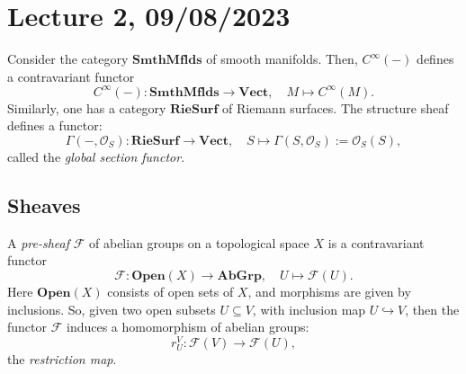 \documentclass[a4paper]{report}
\theoremstyle{definition}
\theoremstyle{remark}
\theoremstyle{proposition}
\theoremstyle{conjecture}
\theoremstyle{lemma}
\theoremstyle{corollary}
\theoremstyle{exercise}
\theoremstyle{example}
\newcommand{\mcal}{\mathcal}
\begin{document}
\section{Lecture 2, 09/08/2023}

Consider the category $\mathbf{SmthMflds}$ of smooth manifolds. 
Then, $C^\infty(-)$ defines a contravariant functor 
$$C^\infty(-) : \mathbf{SmthMflds} \longrightarrow \mathbf{Vect},\quad M \longmapsto C^\infty(M).$$
Similarly, one has a category $\mathbf{RieSurf}$ of Riemann surfaces.
The structure sheaf defines a functor:
$$\Gamma(-,\mcal{O}_S) : \mathbf{RieSurf} \longrightarrow \mathbf{Vect},\quad S \longmapsto\Gamma(S,\mcal{O}_S) := \mcal{O}_S(S),$$
called the \emph{global section functor}.



\subsection{Sheaves}

A \emph{pre-sheaf} $\mcal{F}$ of abelian groups on a topological space $X$ is a
contravariant functor
$$\mcal{F} : \mathbf{Open}(X) \longrightarrow \mathbf{AbGrp}, \quad U\longmapsto \mcal{F}(U).$$
Here $\mathbf{Open}(X)$ consists of open sets of $X$, and morphisms are
 given by inclusions. So, given two open subsets $U\subseteq V$, 
 with inclusion map $U\hookrightarrow V$, then the functor $\mcal{F}$
 induces a homomorphism of abelian groups: 
 $$r_U^V : \mcal{F}(V) \to \mcal{F}(U),$$
 the \emph{restriction map}.
\end{document}
